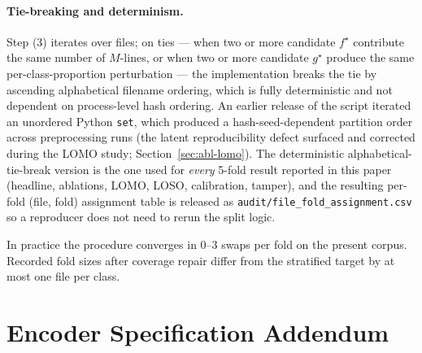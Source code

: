 \documentclass[11pt,a4paper]{article}
\begin{document}
\paragraph{Tie-breaking and determinism.} Step (3) iterates over files; on ties --- when two or more candidate $f^\star$ contribute the same number of $M$-lines, or when two or more candidate $g^\star$ produce the same per-class-proportion perturbation --- the implementation breaks the tie by ascending alphabetical filename ordering, which is fully deterministic and not dependent on process-level hash ordering. An earlier release of the script iterated an unordered Python \texttt{set}, which produced a hash-seed-dependent partition order across preprocessing runs (the latent reproducibility defect surfaced and corrected during the LOMO study; Section~\ref{sec:abl-lomo}). The deterministic alphabetical-tie-break version is the one used for \emph{every} 5-fold result reported in this paper (headline, ablations, LOMO, LOSO, calibration, tamper), and the resulting per-fold (file, fold) assignment table is released as \texttt{audit/file\_fold\_assignment.csv} so a reproducer does not need to rerun the split logic.

In practice the procedure converges in 0--3 swaps per fold on the present corpus. Recorded fold sizes after coverage repair differ from the stratified target by at most one file per class.


\section{Encoder Specification Addendum}
\label{app:encoder-spec}
\end{document}
